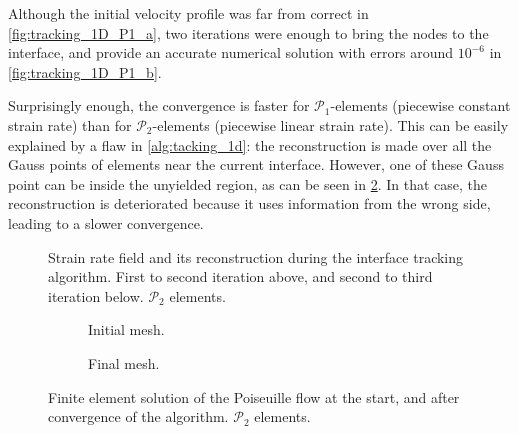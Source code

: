 \documentclass[11 pt]{report}
\begin{document}
\FloatBarrier
Although the initial velocity profile was far from correct in \cref{fig:tracking_1D_P1_a}, two iterations were enough to bring the nodes to the interface, and provide an accurate numerical solution with errors around $10^{-6}$ in \cref{fig:tracking_1D_P1_b}.

Surprisingly enough, the convergence is faster for $\mathcal{P}_1$-elements (piecewise constant strain rate) than for $\mathcal{P}_2$-elements (piecewise linear strain rate). This can be easily explained by a flaw in \cref{alg:tacking_1d}: the reconstruction is made over all the Gauss points of elements near the current interface. However, one of these Gauss point can be inside the unyielded region, as can be seen in \cref{fig:tracking_1D_P2_steps}. In that case, the reconstruction is deteriorated because it uses information from the wrong side, leading to a slower convergence.

\begin{figure}[hb]
    \centering
    \begin{subfigure}[t]{\textwidth}
        
        \label{subfig:tracking_1D_P2_step_1}
    \end{subfigure}
    \begin{subfigure}[t]{\textwidth}
        
    \end{subfigure}
    \caption{Strain rate field and its reconstruction during the interface tracking algorithm. First to second iteration above, and second to third iteration below. $\mathcal{P}_2$ elements.}
    \label{fig:tracking_1D_P2_steps}
\end{figure}

\begin{figure}[ht]
    \centering
    \begin{subfigure}[t]{\textwidth}
        
        \caption{Initial mesh.}
    \end{subfigure}
    \begin{subfigure}[t]{\textwidth}
        
        \caption{Final mesh.}
    \end{subfigure}
    \caption{Finite element solution of the Poiseuille flow at the start, and after convergence of the algorithm. $\mathcal{P}_2$ elements.}
    \label{fig:tracking_1D_P2}
\end{figure}
\end{document}
